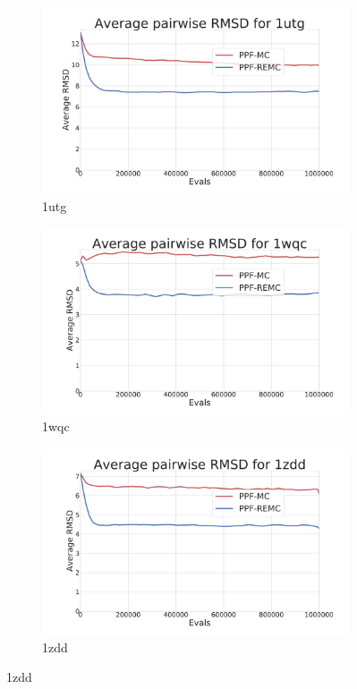 \begin{figure}[ht]\ContinuedFloat
  \begin{subfigure}{0.7\linewidth}
    \centering
    \includegraphics[width=1\linewidth]{Figuras/plots/rmsd_convergence/avg_rmsd_1utg.pdf}
    \caption{1utg}
  \end{subfigure}
%
  \begin{subfigure}{0.7\linewidth}
    \centering
    \includegraphics[width=1\linewidth]{Figuras/plots/rmsd_convergence/avg_rmsd_1wqc.pdf}
    \caption{1wqc}
  \end{subfigure}
%
  \begin{subfigure}{0.7\linewidth}
    \centering
    \includegraphics[width=1\linewidth]{Figuras/plots/rmsd_convergence/avg_rmsd_1zdd.pdf}
    \caption{1zdd}
  \end{subfigure}
\end{figure}

